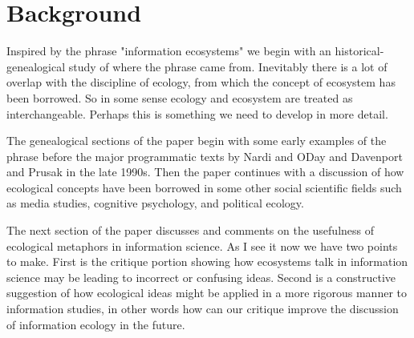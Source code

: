 \section{Background}

Inspired by the phrase "information ecosystems" we begin with an historical-genealogical study of where the phrase came from. Inevitably there is a lot of overlap with the discipline of ecology, from which the concept of ecosystem has been borrowed. So in some sense ecology and ecosystem are treated as interchangeable. Perhaps this is something we need to develop in more detail.

The genealogical sections of the paper begin with some early examples of the phrase before the major programmatic texts by Nardi and ODay and Davenport and Prusak in the late 1990s. Then the paper continues with a discussion of how ecological concepts have been borrowed in some other social scientific fields such as media studies, cognitive psychology, and political ecology.

The next section of the paper discusses and comments on the usefulness of ecological metaphors in information science. As I see it now we have two points to make. First is the critique portion showing how ecosystems talk in information science may be leading to incorrect or confusing ideas. Second is a constructive suggestion of how ecological ideas might be applied in a more rigorous manner to information studies, in other words how can our critique improve the discussion of information ecology in the future.
